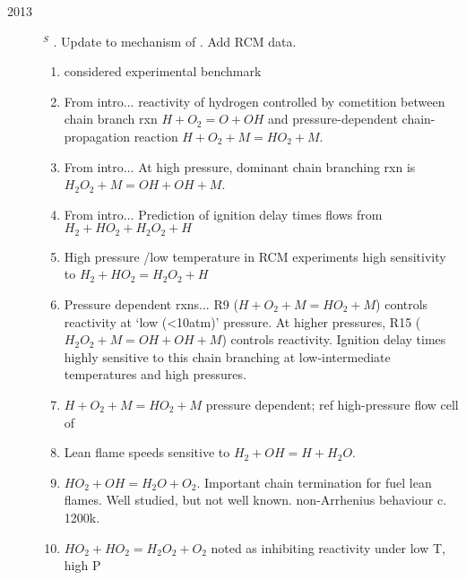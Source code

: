 \documentclass[preprint,3p,times,twocolumn]{elsarticle}
\begin{document}
\begin{description}
                \item[2013]$^S$
                  \citet{Keromnes_Many_Curran13}. Update to mechanism
                  of \cite{ConaireCSPW04}. Add RCM data.
                  \begin{enumerate}
                  \item \citet{MittalSY06} considered experimental
                    benchmark
                    \item From intro... reactivity of hydrogen
                      controlled by cometition between chain branch
                      rxn $H + O_2 = O + OH$ and pressure-dependent
                      chain-propagation reaction $H + O_2 + M = HO_2 +M$.
                    \item From intro... At high pressure, dominant
                      chain branching rxn is $H_2O_2 +M = OH + OH +
                      M$.
                    \item From intro... Prediction of ignition delay times flows
                      from $H_2 + HO_2 + H_2O_ 2+ H$
                    \item High pressure /low temperature in RCM
                      experiments high sensitivity to $H_2 + HO_2 =
                      H_2O_2 + H$
                      \item Pressure dependent rxns... R9 ($H + O_2 +
                        M  = HO_2 + M$) controls reactivity at `low
                        (<10atm)' pressure. At higher pressures, R15
                        ($H_2O_2 + M = OH +OH + M$) controls
                        reactivity. Ignition delay times highly
                        sensitive to this chain branching at
                        low-intermediate temperatures and high
                        pressures. 
                      \item $H+O_2 +M = HO_2 +M$ pressure dependent;
                        ref high-pressure flow cell of
                        \cite{FernandesLTU08}
                        \item Lean flame speeds sensitive to $H_2 + OH
                          = H + H_2O$.
                        \item $HO_2 + OH = H_2O + O_2$. Important
                          chain termination for fuel lean
                          flames. Well studied, but not well
                          known. non-Arrhenius behaviour c. 1200k.
                        \item $HO_2 + HO_2 = H_2O_2 + O_2$ noted as
                          inhibiting reactivity under low T, high P

\end{enumerate}
\end{description}
\end{document}
